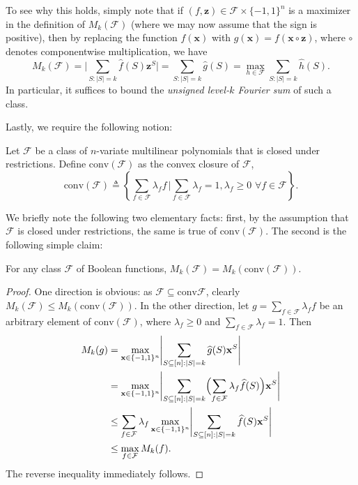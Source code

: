To see why this holds, simply note that if $(f,\mathbf{z})\in \mathcal{F}\times \{-1,1\}^n$ is a maximizer in the definition of $M_k(\mathcal{F})$ (where we may now assume that the sign is positive), then by replacing the function $f(\mathbf{x})$ with $g(\mathbf{x})=f(\mathbf{x}\circ \mathbf{z})$, where $\circ$ denotes componentwise multiplication, we have 
\begin{equation*}
    M_k(\mathcal{F})
    = \Biggl| \sum_{S:\vert S\vert=k} \hat{f}(S)\mathbf{z}^S \Biggr|
    = \sum_{S:\vert S\vert=k} \hat{g}(S)=\max_{h\in \mathcal{F}} \sum_{S:\vert S\vert=k} \hat{h}(S).
\end{equation*}
In particular, it suffices to bound the \emph{unsigned level-$k$ Fourier sum} of such a class.

Lastly, we require the following notion:

\begin{definition}
Let $\mathcal{F}$ be a class of $n$-variate multilinear polynomials that is closed under restrictions.  Define $\mathrm{conv}(\mathcal{F})$ as the convex closure of $\mathcal{F}$,
\begin{equation*}
    \mathrm{conv}(\mathcal{F})\triangleq \left\{\sum_{f\in \mathcal{F}} \lambda_f f\,\bigg\vert \sum_{f\in \mathcal{F}} \lambda_f=1, \lambda_f\geq 0 \,\,\forall f\in \mathcal{F}\right\}.
\end{equation*}
\end{definition}
We briefly note the following two elementary facts: first, by the assumption that $\mathcal{F}$ is closed under restrictions, the same is true of $\mathrm{conv}(\mathcal{F})$. The second is the following simple claim:

\begin{lemma}
For any class $\mathcal{F}$ of Boolean functions, $M_k(\mathcal{F})=M_k(\mathrm{conv}(\mathcal{F}))$.
\end{lemma}
\begin{proof}
One direction is obvious: as $\mathcal{F}\subseteq \mathrm{conv}\mathcal{F}$, clearly $M_k(\mathcal{F})\leq M_k(\mathrm{conv}(\mathcal{F}))$. In the other direction, let $g=\sum_{f\in \mathcal{F}} \lambda_f f$ be an arbitrary element of $\mathrm{conv}(\mathcal{F})$, where $\lambda_f\geq 0$ and $\sum_{f\in \mathcal{F}}\lambda_f=1$. Then
\begin{align*}
    M_k(g) &= \max_{\mathbf{x}\in \{-1,1\}^n} \Biggl| \sum_{S\subseteq [n]:\vert S\vert=k} \widehat{g}(S) \mathbf{x}^S \Biggr| \\
    &=\max_{\mathbf{x}\in \{-1,1\}^n} \Biggl| \sum_{S\subseteq [n]:\vert S\vert=k} \Bigl( \sum_{f\in \mathcal{F}}\lambda_f\widehat{f}(S) \Bigr) \mathbf{x}^S \Biggr| \\
    &\leq \sum_{f\in \mathcal{F}} \lambda_f \max_{\mathbf{x}\in \{-1,1\}^n} \Biggl| \sum_{S\subseteq [n]:\vert S\vert=k} \widehat{f}(S) \mathbf{x}^S \Biggr| \\
    &\leq \max_{f\in \mathcal{F}} M_k(f).
\end{align*}
The reverse inequality immediately follows.
\end{proof}

